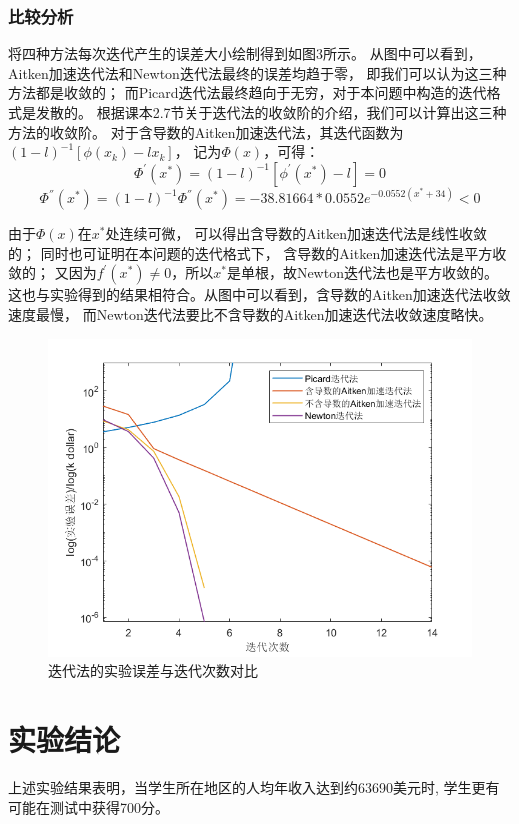 \documentclass[12pt,a4paper]{article}
\begin{document}
\subsubsection{比较分析}
将四种方法每次迭代产生的误差大小绘制得到如图3所示。
从图中可以看到，Aitken加速迭代法和Newton迭代法最终的误差均趋于零，
即我们可以认为这三种方法都是收敛的；
而Picard迭代法最终趋向于无穷，对于本问题中构造的迭代格式是发散的。
根据课本2.7节关于迭代法的收敛阶的介绍，我们可以计算出这三种方法的收敛阶。
对于含导数的Aitken加速迭代法，其迭代函数为$(1-l)^{-1}[\phi(x_k)-lx_k]$，
记为$\Phi(x)$，可得：
$$
\Phi^{'}(x^{*})=(1-l)^{-1}[\phi^{'}(x^{*})-l]=0
$$
$$
\Phi^{''}(x^{*})=(1-l)^{-1}\Phi^{''}(x^{*})=-38.81664*0.0552e^{-0.0552(x^{*}+34)}<0
$$

由于$\Phi(x)$在$x^{*}$处连续可微，
可以得出含导数的Aitken加速迭代法是线性收敛的；
同时也可证明在本问题的迭代格式下，
含导数的Aitken加速迭代法是平方收敛的；
又因为$f^{'}(x^{*})\neq0$，所以$x^{*}$是单根，故Newton迭代法也是平方收敛的。
这也与实验得到的结果相符合。从图中可以看到，含导数的Aitken加速迭代法收敛速度最慢，
而Newton迭代法要比不含导数的Aitken加速迭代法收敛速度略快。
\begin{figure}
    \centering
    \includegraphics[scale=0.6]{pic03.png}
    \caption{迭代法的实验误差与迭代次数对比}
    \label{fig:3}
\end{figure}

\section{实验结论}
上述实验结果表明，当学生所在地区的人均年收入达到约63690美元时,
学生更有可能在测试中获得700分。
\end{document}

